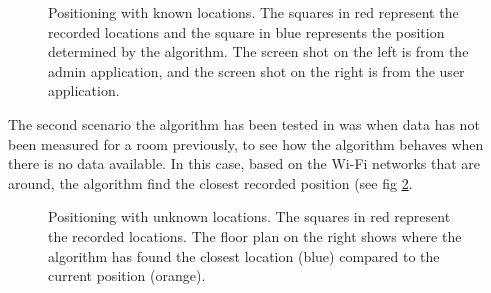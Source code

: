 \begin{figure}[H]
    \centering
    \caption{Positioning with known locations. The squares in red represent the recorded locations and the square in blue represents the position determined by the algorithm. The screen shot on the left is from the admin application, and the screen shot on the right is from the user application.}
    \label{fig:ips-known-loc}
\end{figure}

\newpage
The second scenario the algorithm has been tested in was when data has not been measured for a room previously, to see how the algorithm behaves when there is no data available. In this case, based on the Wi-Fi networks that are around, the algorithm find the closest recorded position (see fig \ref{fig:ips-unknown-loc}.

\begin{figure}[H]
    \centering
    \caption{Positioning with unknown locations. The squares in red represent the recorded locations. The floor plan on the right shows where the algorithm has found the closest location (blue) compared to the current position (orange).}
    \label{fig:ips-unknown-loc}
\end{figure}

